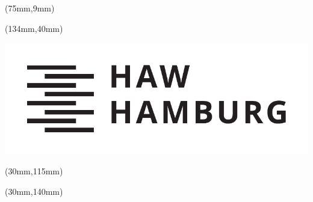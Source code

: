 %
%

\thispagestyle{empty}
\begin{titlepage}
{\selectfont

  \hfuzz=20pt
\begin{textblock*}{\textwidth}(75mm,9mm)
  \begin{minipage}[b][0cm][b]{\textwidth}
  \hfuzz=20pt
  \fontsize{16pt}{16pt}
  \selectfont
    \begin{flushleft}
    	  \IthesisNDAFull
    \end{flushleft}
  \end{minipage}
\end{textblock*}

\begin{textblock*}{\textwidth}(134mm,40mm)
  \begin{minipage}[b][0cm][b]{\textwidth}
    \includegraphics[scale=0.5]{../style/HAW_Marke_schwarz}
  \end{minipage}
\end{textblock*}

\begin{textblock*}{\textwidth}(30mm,115mm)
  \begin{minipage}[b][0cm][b]{\textwidth}
    \fontsize{22pt}{20pt}
    \selectfont
  	\begin{flushright}
      \IthesisKind
  	\end{flushright}
  \end{minipage}
\end{textblock*}

\begin{textblock*}{\textwidth}(30mm,140mm)
  \begin{minipage}[b][0cm][b]{\textwidth}
  \fontsize{14pt}{20pt}
  \selectfont
    \begin{flushright}
      \IthesisAuthor
  	\end{flushright}
  \end{minipage}
\end{textblock*}

}
\end{titlepage}
